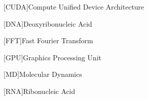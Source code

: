 [CUDA]{Compute Unified Device Architecture}

[DNA]{Deoxyribonucleic Acid}

[FFT]{Fast Fourier Transform}

[GPU]{Graphics Processing Unit}

[MD]{Molecular Dynamics}

[RNA]{Ribonucleic Acid}
